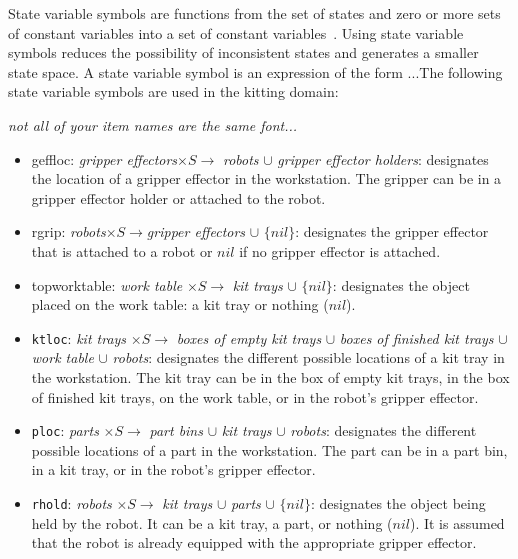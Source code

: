 State variable symbols are functions from the set of states and zero or more sets of constant variables into a set of constant variables~\cite{NAU.2004}. Using state variable symbols reduces the possibility of inconsistent states and generates a smaller state space. A state variable symbol is an expression of the form ...The following state variable symbols are used in the kitting domain:

{\it not all of your item names are the same font...}
\begin{itemize}
\item geffloc: \emph{gripper effectors}$\times S\rightarrow$ \emph{robots} $\cup$ \emph{gripper effector holders}: designates the location of a gripper effector in the workstation. The gripper can be in a gripper effector holder or attached to the robot.


\item rgrip: \emph{robots}$\times S\rightarrow$\emph{gripper effectors} $\cup$ $\lbrace nil\rbrace$: designates the gripper effector that is attached to a robot or $nil$ if no gripper effector is attached.

\item topworktable: \emph{work table} $\times S \rightarrow$ \emph{kit trays} $\cup$ $\lbrace nil\rbrace$: designates the object placed on the work table: a kit tray or nothing ($nil$).

\item \texttt{ktloc}: \emph{kit trays} $\times S \rightarrow$ \emph{boxes of empty kit trays} $\cup$ \emph{boxes of finished kit trays} $\cup$ \emph{work table} $\cup$ \emph{robots}: designates the different possible locations of a kit tray in the workstation. The kit tray can be in the box of empty kit trays, in the box of finished kit trays, on the work table, or in the robot's gripper effector.

\item \texttt{ploc}: \emph{parts} $\times S \rightarrow$ \emph{part bins} $\cup$ \emph{kit trays} $\cup$ \emph{robots}: designates the different possible locations of a part in the workstation. The part can be in a part bin, in a kit tray, or in the robot's gripper effector.

\item \texttt{rhold}: \textit{robots} $\times S \rightarrow$ \textit{kit trays} $\cup$ \textit{parts} $\cup$ $\lbrace nil\rbrace$: designates the object being held by the robot. It can be a kit tray, a part, or nothing ($nil$). It is assumed that the robot is already equipped with the appropriate gripper effector.


\end{itemize}
